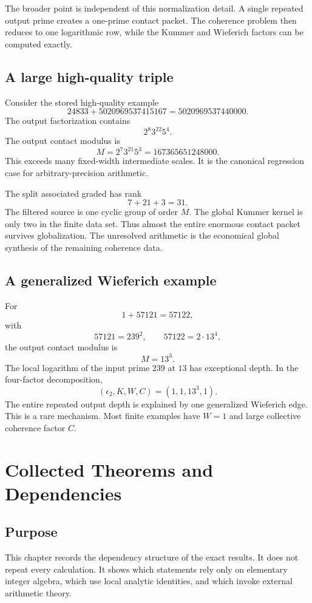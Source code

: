 The broader point is independent of this normalization detail. A single repeated output prime creates a one-prime contact packet. The coherence problem then reduces to one logarithmic row, while the Kummer and Wieferich factors can be computed exactly.

\section{A large high-quality triple}
Consider the stored high-quality example
\[
 24833
 +
 5020969537415167
 =
 5020969537440000.
\]
The output factorization contains
\[
 2^8 3^{22}5^4.
\]
The output contact modulus is
\[
 M=2^7 3^{21}5^3
 =167365651248000.
\]
This exceeds many fixed-width intermediate scales. It is the canonical regression case for arbitrary-precision arithmetic.

The split associated graded has rank
\[
 7+21+3=31.
\]
The filtered source is one cyclic group of order $M$. The global Kummer kernel is only two in the finite data set. Thus almost the entire enormous contact packet survives globalization. The unresolved arithmetic is the economical global synthesis of the remaining coherence data.

\section{A generalized Wieferich example}
For
\[
 1+57121=57122,
\]
with
\[
 57121=239^2,
 \qquad
 57122=2\cdot13^4,
\]
the output contact modulus is
\[
 M=13^3.
\]
The local logarithm of the input prime $239$ at $13$ has exceptional depth. In the four-factor decomposition,
\[
 (\epsilon_2,K,W,C)=(1,1,13^3,1).
\]
The entire repeated output depth is explained by one generalized Wieferich edge. This is a rare mechanism. Most finite examples have $W=1$ and large collective coherence factor $C$.

\chapter{Collected Theorems and Dependencies}

\section{Purpose}
This chapter records the dependency structure of the exact results. It does not repeat every calculation. It shows which statements rely only on elementary integer algebra, which use local analytic identities, and which invoke external arithmetic theory.

